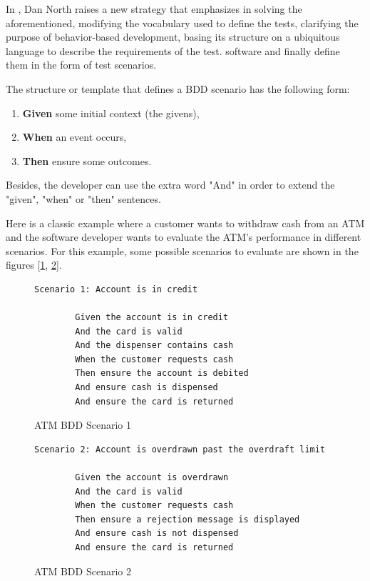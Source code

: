 \documentclass[journal]{IEEEtran}	%
\begin{document}
In \cite{north2010introducing}, Dan North raises a new strategy that emphasizes in solving the aforementioned, modifying the vocabulary used to define the tests, clarifying the purpose of behavior-based development, basing its structure on a ubiquitous language to describe the requirements of the test. software and finally define them in the form of test scenarios.

The structure or template that defines a BDD scenario has the following form:

\begin{enumerate}
    \item \textbf{Given} some initial context (the givens),
    \item \textbf{When} an event occurs,
    \item \textbf{Then} ensure some outcomes. 
\end{enumerate}

Besides, the developer can use the extra word "And" in order to extend the "given", "when" or "then" sentences.

Here is a classic example where a customer wants to withdraw cash from an ATM and the software developer wants to evaluate the ATM's performance in different scenarios. For this example, some possible scenarios to evaluate are shown in the figures [\ref{fig:ATMscenario1}, \ref{fig:ATMscenario2}].

\begin{figure}[t]
\centering
\begin{lstlisting}[]
    Scenario 1: Account is in credit

        Given the account is in credit
        And the card is valid
        And the dispenser contains cash
        When the customer requests cash
        Then ensure the account is debited
        And ensure cash is dispensed
        And ensure the card is returned
\end{lstlisting}
\caption{ATM BDD Scenario 1}
\label{fig:ATMscenario1}
\end{figure}

\begin{figure}[t]
\centering
\begin{lstlisting}[]
    Scenario 2: Account is overdrawn past the overdraft limit

        Given the account is overdrawn
        And the card is valid
        When the customer requests cash
        Then ensure a rejection message is displayed
        And ensure cash is not dispensed
        And ensure the card is returned
\end{lstlisting}
\caption{ATM BDD Scenario 2}
\label{fig:ATMscenario2}
\end{figure}
\end{document}
